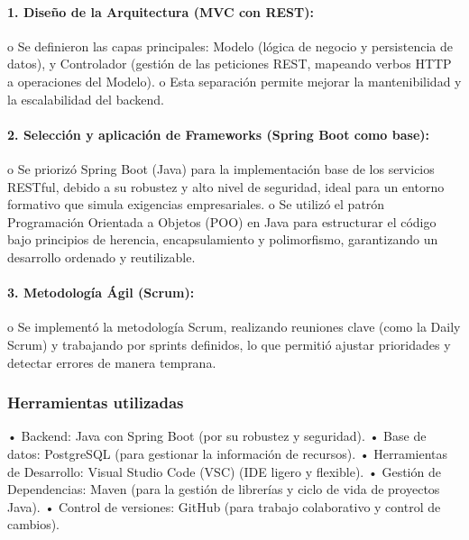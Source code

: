 \paragraph{1. Diseño de la Arquitectura (MVC con REST):}
o	Se definieron las capas principales: Modelo (lógica de negocio y persistencia de datos), y Controlador (gestión de las peticiones REST, mapeando verbos HTTP a operaciones del Modelo).
o	Esta separación permite mejorar la mantenibilidad y la escalabilidad del backend.

\paragraph{2. Selección y aplicación de Frameworks (Spring Boot como base):}
o	Se priorizó Spring Boot (Java) para la implementación base de los servicios RESTful, debido a su robustez y alto nivel de seguridad, ideal para un entorno formativo que simula exigencias empresariales.
o	Se utilizó el patrón Programación Orientada a Objetos (POO) en Java para estructurar el código bajo principios de herencia, encapsulamiento y polimorfismo, garantizando un desarrollo ordenado y reutilizable.

\paragraph{3. Metodología Ágil (Scrum):}
o	Se implementó la metodología Scrum, realizando reuniones clave (como la Daily Scrum) y trabajando por sprints definidos, lo que permitió ajustar prioridades y detectar errores de manera temprana.

\subsubsection{Herramientas utilizadas}
•	Backend: Java con Spring Boot (por su robustez y seguridad).
•	Base de datos: PostgreSQL (para gestionar la información de recursos).
•	Herramientas de Desarrollo: Visual Studio Code (VSC) (IDE ligero y flexible).
•	Gestión de Dependencias: Maven (para la gestión de librerías y ciclo de vida de proyectos Java).
•	Control de versiones: GitHub (para trabajo colaborativo y control de cambios).